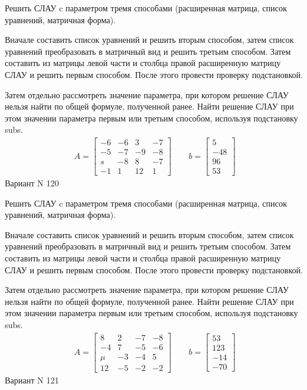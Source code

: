 \documentclass[11pt]{report}
\begin{document}
Решить СЛАУ c параметром тремя способами (расширенная матрица, список уравнений, матричная форма).

Вначале составить список уравнений и решить вторым способом,
затем список уравнений преобразовать в матричный вид и решить третьим способом.
Затем составить из матрицы левой части и столбца правой расширенную матрицу СЛАУ и решить первым способом.
После этого провести проверку подстановкой.

Затем отдельно рассмотреть значение параметра, при котором решение СЛАУ нельзя найти по общей формуле,
полученной ранее.
Найти решение СЛАУ при этом значении параметра первым или третьим способом, используя подстановку subs.
\begin{align*}
    A = \left[\begin{matrix}-6 & -6 & 3 & -7\\-5 & -7 & -9 & -8\\s & -8 & 8 & -7\\-1 & 1 & 12 & 1\end{matrix}\right]
\qquad b = \left[\begin{matrix}5\\-48\\96\\53\end{matrix}\right]
\end{align*}
\newpage
Вариант N 120


Решить СЛАУ c параметром тремя способами (расширенная матрица, список уравнений, матричная форма).

Вначале составить список уравнений и решить вторым способом,
затем список уравнений преобразовать в матричный вид и решить третьим способом.
Затем составить из матрицы левой части и столбца правой расширенную матрицу СЛАУ и решить первым способом.
После этого провести проверку подстановкой.

Затем отдельно рассмотреть значение параметра, при котором решение СЛАУ нельзя найти по общей формуле,
полученной ранее.
Найти решение СЛАУ при этом значении параметра первым или третьим способом, используя подстановку subs.
\begin{align*}
    A = \left[\begin{matrix}8 & 2 & -7 & -8\\-4 & 7 & -5 & -6\\\mu & -3 & -4 & 5\\12 & -5 & -2 & -2\end{matrix}\right]
\qquad b = \left[\begin{matrix}53\\123\\-14\\-70\end{matrix}\right]
\end{align*}
\newpage
Вариант N 121
\end{document}
